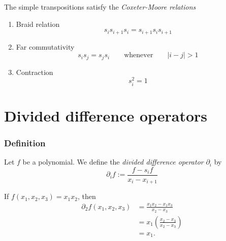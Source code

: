 \documentclass{article}
\begin{document}
\begin{theorem}\label{thm:simplecoxeterrelations}
    The simple transpositions satisfy the \textit{Coxeter-Moore relations}
    \begin{enumerate}[label=(\alph*)]
        \item Braid relation 
            \begin{equation}\label{eq:simplebraid}
                s_is_{i+1}s_i = s_{i+1}s_is_{i+1}
            \end{equation}
        \item Far commutativity
            \begin{equation}\label{eq:simplecommute}
                s_is_j = s_js_i\qquad \text{whenever}\qquad|i-j| > 1
            \end{equation}
        \item Contraction
            \begin{equation}\label{eq:simplecontract}
                s_i^2 = 1
            \end{equation}
    \end{enumerate}
\end{theorem}

\section{Divided difference operators}

\subsubsection{Definition}

\begin{definition}
    Let $f$ be a polynomial. 
    We define the \textit{divided difference operator} $\partial_i$ by 
    \begin{equation}
        \partial_i f := \frac{f-s_if}{x_i-x_{i+1}}
    \end{equation}
\end{definition}

\begin{example}
    If $f(x_1, x_2, x_3) = x_1x_2$, then
    \begin{align*}
        \partial_2 f(x_1,x_2,x_3) &= \frac{x_1x_2 - x_1x_3}{x_2 - x_3} \\
                                  &= x_1\left(\frac{x_2-x_3}{x_2-x_3}\right) \\
                                  &= x_1.
    \end{align*}
\end{example}
\end{document}

